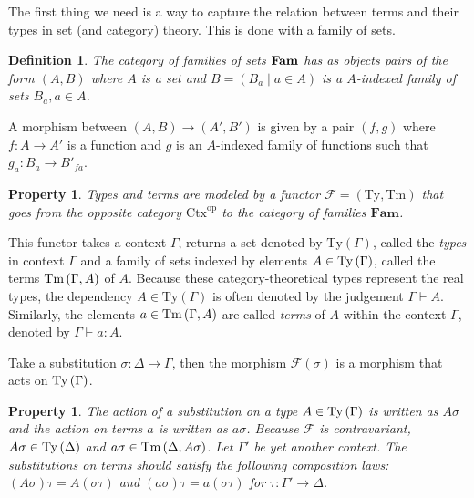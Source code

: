 \documentclass[12pt,a4paper,twoside,xetex]{book}
\newcommand{\keyword}[1]{\emph{#1}\index{#1}}
\newtheorem{definition}[theorem]{Definition}
\newtheorem{property}[theorem]{Property}
\begin{document}
The first thing we need is a way to capture the relation between terms and their types in set (and category) theory. This is done with a family of sets. 

\begin{definition}
The category of  \keyword{families of sets} $ \text{\textbf{Fam}}$ has as objects pairs of the form $\left(A,B\right)$ where $A$ is a set and $B=\left(B_{a}\mid a\in A\right)$ is a $A$-indexed family of sets $B_{a},a\in A$. 
\end{definition}

A morphism between $\left(A,B\right)\rightarrow\left(A',B'\right)$ is given by a pair $\left(f,g\right)$ where $f:A\rightarrow A'$ is a function and $g$ is an $A$-indexed family of functions such that $g_{a}:B_{a}\rightarrow B'_{fa}$.


\begin{property}\label{type_functor} Types and terms are modeled by a functor $\mathcal{F}=\left(\text{Ty},\text{Tm}\right)$ that goes from the opposite category $\text{Ctx}^{\text{op}}$ to the category of families $\textbf{Fam}$.
\end{property}

This functor takes a context $\Gamma$, returns a set denoted by $\text{Ty}\left(\Gamma\right)$, called the \keyword{types} in context $\Gamma$ and a family of sets indexed by elements $A\in\text{Ty}\left(\Gamma\right)$, called the terms $\text{Tm}\left(\Gamma,A\right)$ of $A$. Because these category-theoretical types represent the real types, the dependency $A \in \text{Ty}(\Gamma)$ is often denoted by the judgement $\Gamma\vdash A$. Similarly, the elements $a\in\text{Tm}\left(\Gamma,A\right)$ are called \keyword{terms} of $A$ within the context $\Gamma$, denoted by $\Gamma\vdash a:A$.

 Take a substitution $\sigma:\Delta\rightarrow\Gamma$, then the morphism $\mathcal{F}(\sigma)$ is a morphism that acts on $\text{Ty}\left(\Gamma\right)$. 

\begin{property}\label{composition_laws}
The action of a substitution on a type $A\in\text{Ty}\left(\Gamma\right)$ is written as $A\sigma$ and the action on terms $a$ is written as $a\sigma$. Because $\mathcal{F}$ is contravariant, $A \sigma\in \text{Ty}\left(\Delta\right)$ and $a \sigma \in \text{Tm}\left(\Delta,A \sigma\right)$. Let $\Gamma '$ be yet another context. The substitutions on terms should satisfy
the following composition laws: $\left(A\sigma\right)\tau=A\left(\sigma\tau\right)$
and $\left(a\sigma\right)\tau=a\left(\sigma\tau\right)$ for $\tau:\Gamma'\rightarrow\Delta$.
\end{property}
\end{document}
